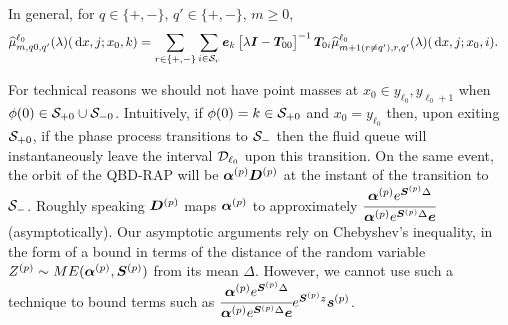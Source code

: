 In general, for \(q\in \{+,-\}, \, q'\in\{+,-\}\), \(m\geq 0\),
\begin{align*}
	\widehat \mu_{m,q0,q'}^{\ell_0}(\lambda)(\, \mathrm{d} x,j;x_0,k) \nonumber 
	&= \sum_{r\in\{+,-\}}\sum_{i\in\mathcal{S}_r}\boldsymbol e_k\begin{bmatrix} \lambda \boldsymbol I - \boldsymbol T_{00} \end{bmatrix}^{-1}\boldsymbol T_{0i}\widehat \mu_{m+1(r\neq q'),r,q'}^{\ell_0}(\lambda)(\, \mathrm{d} x,j;x_0,i).
\end{align*}

\begin{rem}
For technical reasons we should not have point masses at \(x_0\in{y_{\ell_0},y_{\ell_0+1}}\) when \(\phi(0)\in\mathcal{S}_{+0}\cup\mathcal{S}_{-0}\). Intuitively, if \(\phi(0)=k\in\mathcal{S}_{+0}\) and \(x_0 = y_{\ell_0}\) then, upon exiting \(\mathcal{S}_{+0}\), if the phase process transitions to \(\mathcal{S}_-\) then the fluid queue will instantaneously leave the interval \(\mathcal{D}_{\ell_0}\) upon this transition. On the same event, the orbit of the QBD-RAP will be \(\boldsymbol \alpha^{(p)} \boldsymbol D^{(p)}\) at the instant of the transition to \(\mathcal{S}_-\). Roughly speaking \(\boldsymbol D^{(p)}\) maps \(\boldsymbol \alpha^{(p)}\) to approximately \(\cfrac{\boldsymbol \alpha^{(p)} e^{\boldsymbol S^{(p)}\Delta}}{\boldsymbol \alpha^{(p)} e^{\boldsymbol S^{(p)}\Delta}\boldsymbol e}\) (asymptotically). Our asymptotic arguments rely on Chebyshev's inequality, in the form of a bound in terms of the distance of the random variable \(Z^{(p)}\sim ME(\boldsymbol\alpha^{(p)},\boldsymbol S^{(p)})\) from its mean \(\Delta\). However, we cannot use such a technique to bound terms such as \(\cfrac{\boldsymbol \alpha^{(p)} e^{\boldsymbol S^{(p)}\Delta}}{\boldsymbol \alpha^{(p)} e^{\boldsymbol S^{(p)}\Delta}\boldsymbol e}e^{\boldsymbol S^{(p)}z}\boldsymbol s^{(p)}\). %


\end{rem}
